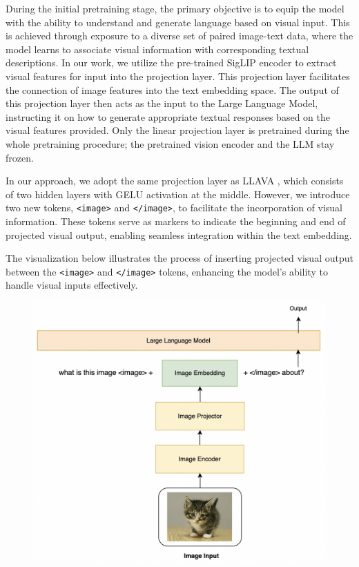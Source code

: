 \documentclass[preprint]{article}
\begin{document}
During the initial pretraining stage, the primary objective is to equip the model with the ability to understand and generate language based on visual input. This is achieved through exposure to a diverse set of paired image-text data, where the model learns to associate visual information with corresponding textual descriptions. In our work, we utilize the pre-trained SigLIP encoder \cite{zhai2023sigmoid} to extract visual features for input into the projection layer. This projection layer facilitates the connection of image features into the text embedding space. The output of this projection layer then acts as the input to the Large Language Model, instructing it on how to generate appropriate textual responses based on the visual features provided. Only the linear projection layer is pretrained during the whole pretraining procedure; the pretrained vision encoder and the LLM stay frozen.

In our approach, we adopt the same projection layer as LLAVA \cite{liu2023visual}, which consists of two hidden layers with GELU activation at the middle. However, we introduce two new tokens, \texttt{<image>} and \texttt{</image>}, to facilitate the incorporation of visual information. These tokens serve as markers to indicate the beginning and end of projected visual output, enabling seamless integration within the text embedding.

\newpage

The visualization below illustrates the process of inserting projected visual output between the \texttt{<image>} and \texttt{</image>} tokens, enhancing the model's ability to handle visual inputs effectively.

\begin{figure}[hbt!]
  \centering
  \includegraphics[width=0.6\linewidth]{pic/visual.png} %
\end{figure}
\end{document}
